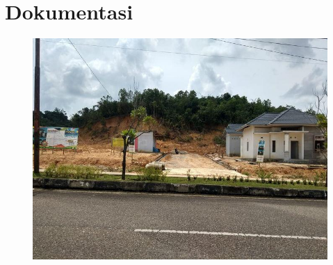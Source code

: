 %


%


\renewcommand{\thepage}{B - \arabic{page}}
\chapter{Dokumentasi}

\begin{figure}
        \centering
        \includegraphics[width=0.75\linewidth]{lampiran c.jpg}
    \end{figure}
